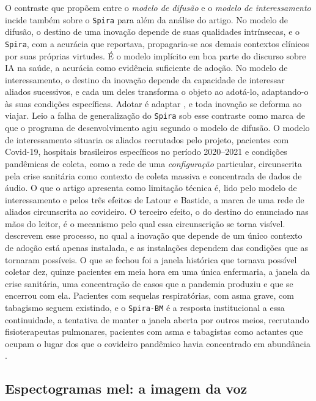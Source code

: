 O contraste que \textcite{AkrichCallonLatour2002} propõem entre o \textit{modelo de difusão} e o \textit{modelo de interessamento} incide também sobre o \texttt{Spira} para além da análise do artigo. No modelo de difusão, o destino de uma inovação depende de suas qualidades intrínsecas, e o \texttt{Spira}, com a acurácia que reportava, propagaria-se aos demais contextos clínicos por suas próprias virtudes. É o modelo implícito em boa parte do discurso sobre IA na saúde, a acurácia como evidência suficiente de adoção. No modelo de interessamento, o destino da inovação depende da capacidade de interessar aliados sucessivos, e cada um deles transforma o objeto ao adotá-lo, adaptando-o às suas condições específicas. Adotar é adaptar \parencite{AkrichCallonLatour2002}, e toda inovação se deforma ao viajar. Leio a falha de generalização do \texttt{Spira} sob esse contraste como marca de que o programa de desenvolvimento agiu segundo o modelo de difusão. O modelo de interessamento situaria os aliados recrutados pelo projeto, pacientes com Covid-19, hospitais brasileiros específicos no período 2020--2021 e condições pandêmicas de coleta, como a rede de uma \textit{configuração} particular, circunscrita pela crise sanitária como contexto de coleta massiva e concentrada de dados de áudio. O que o artigo apresenta como limitação técnica é, lido pelo modelo de interessamento e pelos três efeitos de Latour e Bastide, a marca de uma rede de aliados circunscrita ao covideiro. O terceiro efeito, o do destino do enunciado nas mãos do leitor, é o mecanismo pelo qual essa circunscrição se torna visível. \textcite{AkrichCallonLatour2002} descrevem esse processo, no qual a inovação que depende de um único contexto de adoção está apenas instalada, e as instalações dependem das condições que as tornaram possíveis. O que se fechou foi a janela histórica que tornava possível coletar dez, quinze pacientes em meia hora em uma única enfermaria, a janela da crise sanitária, uma concentração de casos que a pandemia produziu e que se encerrou com ela. Pacientes com sequelas respiratórias, com asma grave, com tabagismo seguem existindo, e o \texttt{Spira-BM} é a resposta institucional a essa continuidade, a tentativa de manter a janela aberta por outros meios, recrutando fisioterapeutas pulmonares, pacientes com asma e tabagistas como actantes que ocupam o lugar dos que o covideiro pandêmico havia concentrado em abundância \parencite{Finger2025SPIRABM}.

\subsection{Espectogramas mel: a imagem da voz}
\label{subsec:voz_espectrograma}

